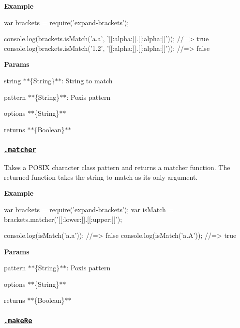 {\bfseries Example}


\begin{DoxyCode}
var brackets = require('expand-brackets');

console.log(brackets.isMatch('a.a', '[[:alpha:]].[[:alpha:]]'));
//=> true
console.log(brackets.isMatch('1.2', '[[:alpha:]].[[:alpha:]]'));
//=> false
\end{DoxyCode}


{\bfseries Params}


\begin{DoxyItemize}
\item {\ttfamily string} $\ast$$\ast$\{String\}$\ast$$\ast$\+: String to match
\item {\ttfamily pattern} $\ast$$\ast$\{String\}$\ast$$\ast$\+: Poxis pattern
\item {\ttfamily options} $\ast$$\ast$\{String\}$\ast$$\ast$
\item {\ttfamily returns} $\ast$$\ast$\{Boolean\}$\ast$$\ast$
\end{DoxyItemize}

\subsubsection*{\href{index.js#L123}{\tt .matcher}}

Takes a P\+O\+S\+IX character class pattern and returns a matcher function. The returned function takes the string to match as its only argument.

{\bfseries Example}


\begin{DoxyCode}
var brackets = require('expand-brackets');
var isMatch = brackets.matcher('[[:lower:]].[[:upper:]]');

console.log(isMatch('a.a'));
//=> false
console.log(isMatch('a.A'));
//=> true
\end{DoxyCode}


{\bfseries Params}


\begin{DoxyItemize}
\item {\ttfamily pattern} $\ast$$\ast$\{String\}$\ast$$\ast$\+: Poxis pattern
\item {\ttfamily options} $\ast$$\ast$\{String\}$\ast$$\ast$
\item {\ttfamily returns} $\ast$$\ast$\{Boolean\}$\ast$$\ast$
\end{DoxyItemize}

\subsubsection*{\href{index.js#L145}{\tt .make\+Re}}


